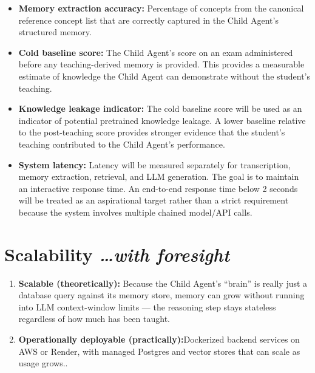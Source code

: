 \documentclass[11pt,a4paper]{article}
\newcommand{\mysection}[2]{%
    \section[#1]{#1 \hfill {\normalfont\itshape #2}}
}
\begin{document}
\begin{itemize}

    \item \textbf{Memory extraction accuracy:} Percentage of concepts from the canonical reference concept list that are correctly captured in the Child Agent's structured memory.

    \item \textbf{Cold baseline score:} The Child Agent's score on an exam administered before any teaching-derived memory is provided. This provides a measurable estimate of knowledge the Child Agent can demonstrate without the student's teaching.

    \item\textbf{Knowledge leakage indicator:} The cold baseline score will be used as an indicator of potential pretrained knowledge leakage. A lower baseline relative to the post-teaching score provides stronger evidence that the student's teaching contributed to the Child Agent's performance.

    \item \textbf{System latency:} Latency will be measured separately for transcription, memory extraction, retrieval, and LLM generation. The goal is to maintain an interactive response time. An end-to-end response time below 2 seconds will be treated as an aspirational target rather than a strict requirement because the system involves multiple chained model/API calls.

\end{itemize}


\mysection{Scalability}{\ldots with foresight}

\begin{enumerate}

    \item \textbf{Scalable (theoretically):} Because the Child Agent's ``brain'' is really just a database query against its memory store, memory can grow without running into LLM context-window limits --- the reasoning step stays stateless regardless of how much has been taught.

    \item \textbf{Operationally deployable (practically):}Dockerized backend services on AWS or Render, with managed Postgres and vector stores that can scale as usage grows..

\end{enumerate}
\end{document}
